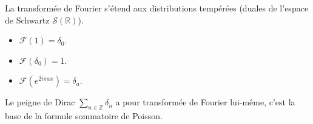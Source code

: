 \begin{proposition}
    La transformée de Fourier s'étend aux distributions tempérées (duales de l'espace de Schwartz $\mathcal{S}(\mathbb{R})$).
\end{proposition}

\begin{example}
    \begin{itemize}
        \item $\mathcal{F}(1) = \delta_0$.
        \item $\mathcal{F}(\delta_0) = 1$.
        \item $\mathcal{F}(e^{2i\pi a x}) = \delta_a$.
    \end{itemize}
    Le peigne de Dirac $\sum_{n \in \mathbb{Z}} \delta_n$ a pour transformée de Fourier lui-même, c'est la base de la formule sommatoire de Poisson.
\end{example}
